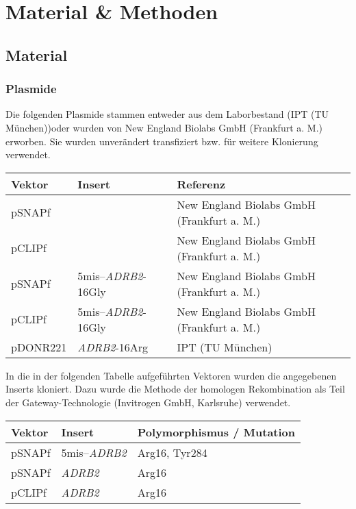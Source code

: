 \chapter{Material \& Methoden}\label{chapter:materialmethoden}

\section{Material}
\subsection{Plasmide}
Die folgenden Plasmide stammen entweder aus dem Laborbestand (IPT (TU München))oder wurden von New England Biolabs GmbH (Frankfurt a. M.) erworben. Sie wurden unverändert transfiziert bzw. für weitere Klonierung verwendet.

\begin{table}[htsb]
    \begin{tabular}{lll}
        \toprule
        Vektor		&	Insert						& 	Referenz	\\
        \midrule
        pSNAPf		&								&	New England Biolabs GmbH (Frankfurt a. M.)\\
        pCLIPf		&								&	New England Biolabs GmbH (Frankfurt a. M.)\\
        pSNAPf		&	5mis--\textit{ADRB2}-16Gly	&	New England Biolabs GmbH (Frankfurt a. M.)\\
        pCLIPf		&	5mis--\textit{ADRB2}-16Gly	&	New England Biolabs GmbH (Frankfurt a. M.)\\
        pDONR221	&	\textit{ADRB2}-16Arg	   		&	IPT (TU München)\\
    \bottomrule
    \end{tabular}
\end{table}

In die in der folgenden Tabelle aufgeführten Vektoren wurden die angegebenen Inserts kloniert. Dazu wurde die Methode der homologen Rekombination als Teil der Gateway-Technologie (Invitrogen GmbH, Karlsruhe) verwendet.

\begin{table}[htsb]
\begin{tabularx}{\textwidth}{lll}
\toprule
Vektor		&	Insert		&	Polymorphismus / Mutation\\
\midrule
pSNAPf		&	5mis--\textit{ADRB2}	&	Arg16, Tyr284\\
pSNAPf		&	\textit{ADRB2}		&	Arg16\\
pCLIPf		&	\textit{ADRB2}		&	Arg16\\
\bottomrule
\end{tabularx}
\end{table}

